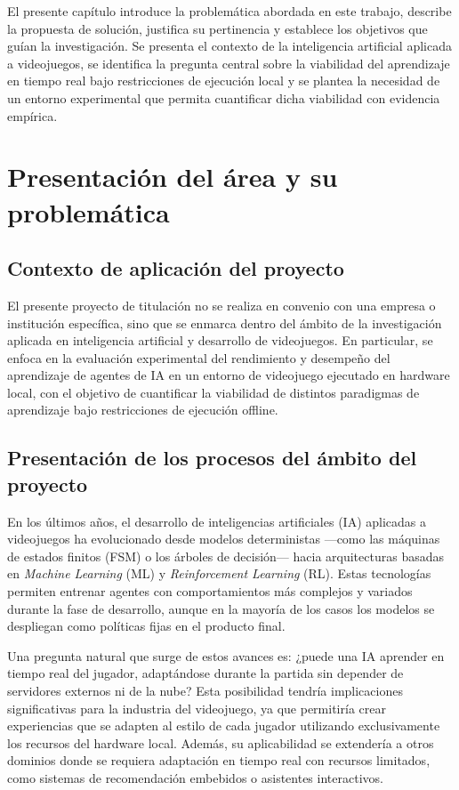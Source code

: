 El presente capítulo introduce la problemática abordada en este trabajo, describe la propuesta de solución, justifica su pertinencia y establece los objetivos que guían la investigación. Se presenta el contexto de la inteligencia artificial aplicada a videojuegos, se identifica la pregunta central sobre la viabilidad del aprendizaje en tiempo real bajo restricciones de ejecución local y se plantea la necesidad de un entorno experimental que permita cuantificar dicha viabilidad con evidencia empírica.

\section{Presentación del área y su problemática}

\subsection{Contexto de aplicación del proyecto}
El presente proyecto de titulación no se realiza en convenio con una empresa o institución específica, sino que se enmarca dentro del ámbito de la investigación aplicada en inteligencia artificial y desarrollo de videojuegos. En particular, se enfoca en la evaluación experimental del rendimiento y desempeño del aprendizaje de agentes de IA en un entorno de videojuego ejecutado en hardware local, con el objetivo de cuantificar la viabilidad de distintos paradigmas de aprendizaje bajo restricciones de ejecución offline.

\subsection{Presentación de los procesos del ámbito del proyecto}

En los últimos años, el desarrollo de inteligencias artificiales (IA) aplicadas a videojuegos ha evolucionado desde modelos deterministas ---como las máquinas de estados finitos (FSM) o los árboles de decisión--- hacia arquitecturas basadas en \textit{Machine Learning} (ML) y \textit{Reinforcement Learning} (RL). Estas tecnologías permiten entrenar agentes con comportamientos más complejos y variados durante la fase de desarrollo, aunque en la mayoría de los casos los modelos se despliegan como políticas fijas en el producto final.

Una pregunta natural que surge de estos avances es: ¿puede una IA aprender en tiempo real del jugador, adaptándose durante la partida sin depender de servidores externos ni de la nube? Esta posibilidad tendría implicaciones significativas para la industria del videojuego, ya que permitiría crear experiencias que se adapten al estilo de cada jugador utilizando exclusivamente los recursos del hardware local. Además, su aplicabilidad se extendería a otros dominios donde se requiera adaptación en tiempo real con recursos limitados, como sistemas de recomendación embebidos o asistentes interactivos.

